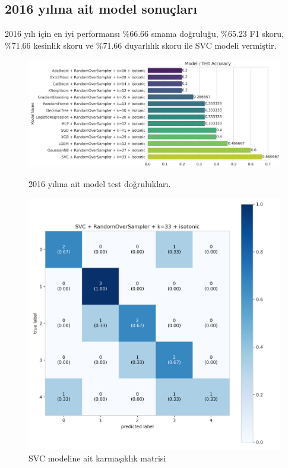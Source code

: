 \newpage

\subsection{2016 yılına ait model sonuçları}
2016 yılı için en iyi performansı \%66.66 sınama doğruluğu,  \%65.23 F1 skoru, \%71.66 kesinlik skoru ve \%71.66 duyarlılık skoru ile SVC modeli vermiştir.

\begin{figure}[ht]
\centering
\begin{minipage}[b]{0.6\textwidth}
    \centering
    \includegraphics[width=\textwidth]{2016.png}
    \caption{2016 yılına ait model test doğrulukları.}
    \label{fig:resim1}
\end{minipage}
\hfill
\begin{minipage}[b]{0.6\textwidth}
    \centering
    \includegraphics[width=\textwidth]{2016_cm.png}
    \caption{SVC modeline ait karmaşıklık matrisi}
    \label{fig:resim2}
\end{minipage}
\end{figure}

